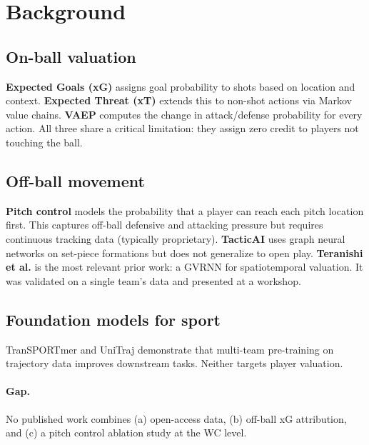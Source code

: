 \documentclass[10pt,twocolumn]{article}
\begin{document}
\section{Background}
\label{sec:background}

\subsection{On-ball valuation}

\textbf{Expected Goals (xG)} \citep{lucey2014} assigns goal probability to shots based on location and context. \textbf{Expected Threat (xT)} \citep{fernandez2019decomposing} extends this to non-shot actions via Markov value chains. \textbf{VAEP} \citep{decroos2019vaep} computes the change in attack/defense probability for every action. All three share a critical limitation: they assign zero credit to players not touching the ball.

\subsection{Off-ball movement}

\textbf{Pitch control} \citep{spearman2017physics, fernandez2018wide} models the probability that a player can reach each pitch location first. This captures off-ball defensive and attacking pressure but requires continuous tracking data (typically proprietary). \textbf{TacticAI} \citep{wang2023tacticai} uses graph neural networks on set-piece formations but does not generalize to open play. \textbf{Teranishi et al.} \citep{teranishi2022} is the most relevant prior work: a GVRNN for spatiotemporal valuation. It was validated on a single team's data and presented at a workshop.

\subsection{Foundation models for sport}

TranSPORTmer \citep{salzmann2024transporter} and UniTraj \citep{ye2024unitraj} demonstrate that multi-team pre-training on trajectory data improves downstream tasks. Neither targets player valuation.

\paragraph{Gap.} No published work combines (a) open-access data, (b) off-ball xG attribution, and (c) a pitch control ablation study at the WC level.
\end{document}
